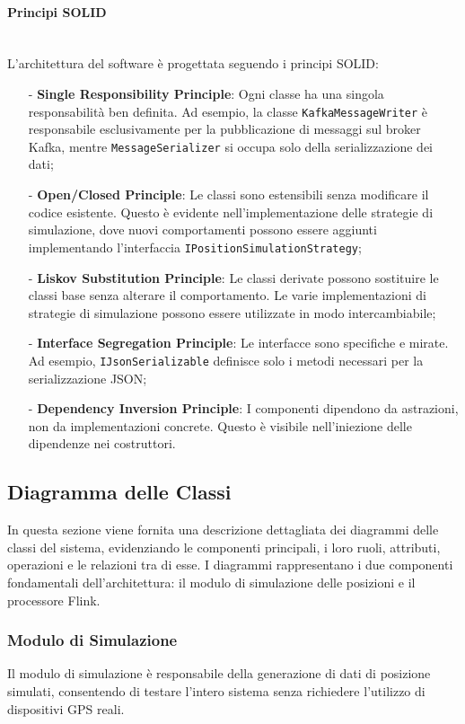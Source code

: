 \documentclass[10pt]{article}
\newcommand{\myparagraph}[1]{\paragraph{#1}\mbox{}\\}
\begin{document}
    \myparagraph{Principi SOLID}
    L'architettura del software è progettata seguendo i principi SOLID:
    \begin{itemize}
        \item[-] \textbf{Single Responsibility Principle}: Ogni classe ha una singola responsabilità ben definita. Ad esempio, la classe \texttt{KafkaMessageWriter} è responsabile esclusivamente per la pubblicazione di messaggi sul broker Kafka, mentre \texttt{MessageSerializer} si occupa solo della serializzazione dei dati;
        \item[-] \textbf{Open/Closed Principle}: Le classi sono estensibili senza modificare il codice esistente. Questo è evidente nell'implementazione delle strategie di simulazione, dove nuovi comportamenti possono essere aggiunti implementando l'interfaccia \texttt{IPositionSimulationStrategy};
        \item[-] \textbf{Liskov Substitution Principle}: Le classi derivate possono sostituire le classi base senza alterare il comportamento. Le varie implementazioni di strategie di simulazione possono essere utilizzate in modo intercambiabile;
        \item[-] \textbf{Interface Segregation Principle}: Le interfacce sono specifiche e mirate. Ad esempio, \texttt{IJsonSerializable} definisce solo i metodi necessari per la serializzazione JSON;
        \item[-] \textbf{Dependency Inversion Principle}: I componenti dipendono da astrazioni, non da implementazioni concrete. Questo è visibile nell'iniezione delle dipendenze nei costruttori.
    \end{itemize}

    \subsection{Diagramma delle Classi}
    In questa sezione viene fornita una descrizione dettagliata dei diagrammi delle classi del sistema, evidenziando le componenti principali, i loro ruoli, attributi, operazioni e le relazioni tra di esse. I diagrammi rappresentano i due componenti fondamentali dell'architettura: il modulo di simulazione delle posizioni e il processore Flink.

    \subsubsection{Modulo di Simulazione}
    Il modulo di simulazione è responsabile della generazione di dati di posizione simulati, consentendo di testare l'intero sistema senza richiedere l'utilizzo di dispositivi GPS reali.
\end{document}
